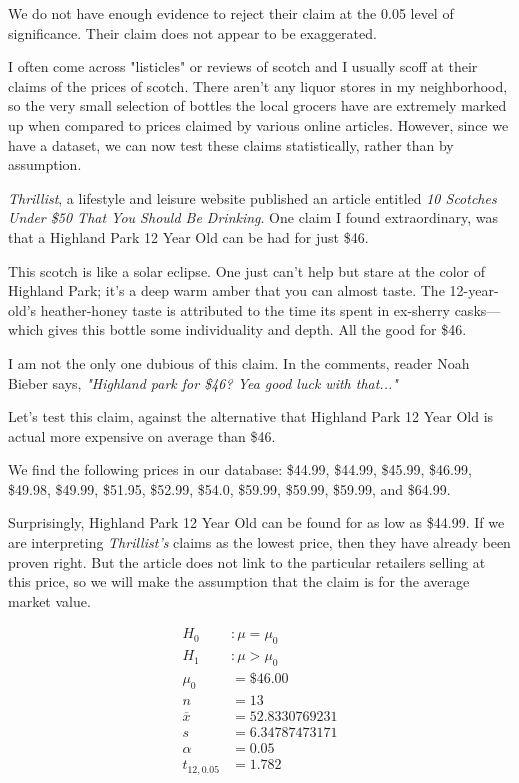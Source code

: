 We do not have enough evidence to reject their claim at the 0.05 level of significance. Their claim does not appear to be exaggerated.

I often come across "listicles" or reviews of scotch and I usually scoff at their claims of the prices of scotch. There aren't any liquor stores in my neighborhood, so the very small selection of bottles the local grocers have are extremely marked up when compared to prices claimed by various online articles. However, since we have a dataset, we can now test these claims statistically, rather than by assumption.

\textit{Thrillist}, a lifestyle and leisure website published an article entitled \textit{10 Scotches Under \$50 That You Should Be Drinking}. One claim I found extraordinary, was that a Highland Park 12 Year Old can be had for just \$46.

\begin{displayquote}
This scotch is like a solar eclipse. One just can't help but stare at the color of Highland Park; it's a deep warm amber that you can almost taste. The 12-year-old's heather-honey taste is attributed to the time its spent in ex-sherry casks—which gives this bottle some individuality and depth. All the good for \$46. \cite{Thrillist}
\end{displayquote}

I am not the only one dubious of this claim. In the comments, reader Noah Bieber says, \textit{"Highland park for \$46? Yea good luck with that..."} 

Let's test this claim, against the alternative that Highland Park 12 Year Old is actual more expensive on average than \$46.

We find the following prices in our database: \$44.99, \$44.99, \$45.99, \$46.99, \$49.98, \$49.99, \$51.95, \$52.99, \$54.0, \$59.99, \$59.99, \$59.99, and \$64.99.

Surprisingly, Highland Park 12 Year Old can be found for as low as \$44.99. If we are interpreting \textit{Thrillist's} claims as the lowest price, then they have already been proven right. But the article does not link to the particular retailers selling at this price, so we will make the assumption that the claim is for the average market value.

\begin{equation*}
\begin{split}
    H_0 &: \mu = \mu_0 \\
    H_1 &: \mu > \mu_0 \\
    \mu_0 &= \$46.00\\
    n &= 13\\
    \overline{x} &= 52.8330769231\\
    s &= 6.34787473171\\
    \alpha &= 0.05\\
    t_{12, 0.05} &= 1.782\\
\end{split}
\end{equation*}

